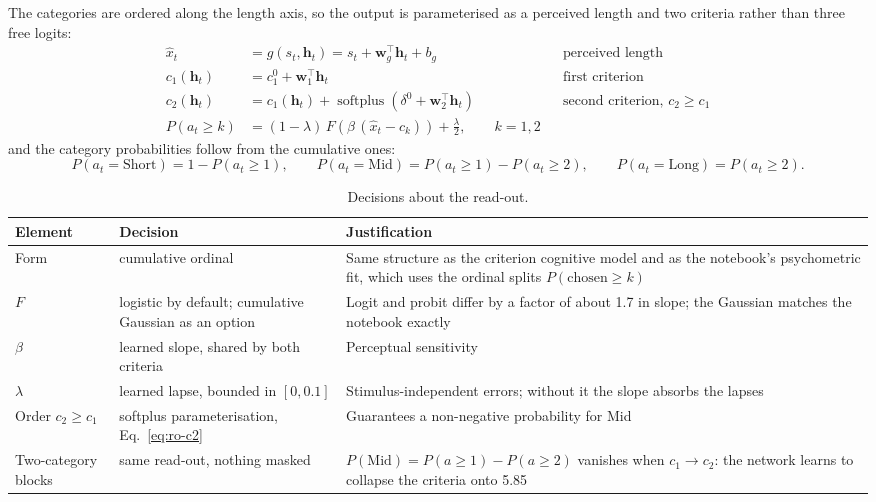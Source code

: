 \documentclass[11pt,a4paper]{article}
\newcommand{\vect}[1]{\bm{#1}}
\newcommand{\T}{^{\top}}
\newcommand{\Short}{\mathrm{Short}}
\newcommand{\Mid}{\mathrm{Mid}}
\newcommand{\Long}{\mathrm{Long}}
\begin{document}
The categories are ordered along the length axis, so the output is parameterised as a
perceived length and two criteria rather than three free logits:
\begin{align}
  \hat{x}_t &= g(s_t, \vect{h}_t) = s_t + \vect{w}_g\T \vect{h}_t + b_g
    && \text{perceived length} \label{eq:ro-x}\\
  c_1(\vect{h}_t) &= c_1^{0} + \vect{w}_1\T \vect{h}_t
    && \text{first criterion} \label{eq:ro-c1}\\
  c_2(\vect{h}_t) &= c_1(\vect{h}_t) + \operatorname{softplus}\!\left(\delta^{0} + \vect{w}_2\T \vect{h}_t\right)
    && \text{second criterion, } c_2 \ge c_1 \label{eq:ro-c2}\\
  P(a_t \ge k) &= (1-\lambda)\,F\!\left(\beta\,(\hat{x}_t - c_k)\right) + \tfrac{\lambda}{2},
    \qquad k = 1, 2 \label{eq:ro-p}
\end{align}
and the category probabilities follow from the cumulative ones:
\begin{equation}
  P(a_t = \Short) = 1 - P(a_t \ge 1), \qquad
  P(a_t = \Mid)   = P(a_t \ge 1) - P(a_t \ge 2), \qquad
  P(a_t = \Long)  = P(a_t \ge 2).
  \label{eq:ro-cat}
\end{equation}

\begin{table}[H]
  \centering\small
  \caption{Decisions about the read-out.}
  \begin{tabular}{lp{5cm}p{7.5cm}}
    \toprule
    Element & Decision & Justification \\
    \midrule
    Form & cumulative ordinal & Same structure as the criterion cognitive model and as the notebook's psychometric fit, which uses the ordinal splits $P(\text{chosen} \ge k)$ \\
    $F$ & logistic by default; cumulative Gaussian as an option & Logit and probit differ by a factor of about 1.7 in slope; the Gaussian matches the notebook exactly \\
    $\beta$ & learned slope, shared by both criteria & Perceptual sensitivity \\
    $\lambda$ & learned lapse, bounded in $[0, 0.1]$ & Stimulus-independent errors; without it the slope absorbs the lapses \\
    Order $c_2 \ge c_1$ & softplus parameterisation, Eq.~\eqref{eq:ro-c2} & Guarantees a non-negative probability for Mid \\
    Two-category blocks & same read-out, nothing masked & $P(\Mid) = P(a \ge 1) - P(a \ge 2)$ vanishes when $c_1 \to c_2$: the network learns to collapse the criteria onto 5.85 \\
    \bottomrule
  \end{tabular}
\end{table}
\end{document}

